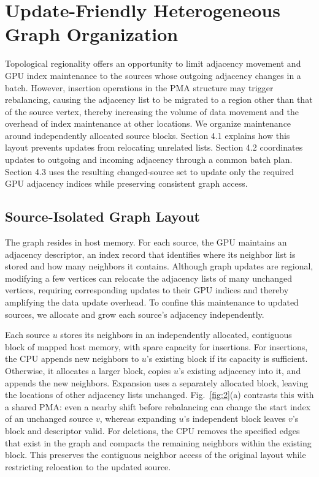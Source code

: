 
\section{Update-Friendly Heterogeneous Graph Organization}


Topological regionality offers an opportunity to limit adjacency movement and GPU index maintenance to the sources whose outgoing adjacency changes in a batch. However, insertion operations in the PMA structure may trigger rebalancing, causing the adjacency list to be migrated to a region other than that of the source vertex, thereby increasing the volume of data movement and the overhead of index maintenance at other locations. We organize maintenance around independently allocated source blocks. Section 4.1 explains how this layout prevents updates from relocating unrelated lists. Section 4.2 coordinates updates to outgoing and incoming adjacency through a common batch plan. Section 4.3 uses the resulting changed-source set to update only the required GPU adjacency indices while preserving consistent graph access.

\subsection{Source-Isolated Graph Layout}


The graph resides in host memory. For each source, the GPU maintains an adjacency descriptor, an index record that identifies where its neighbor list is stored and how many neighbors it contains. Although graph updates are regional, modifying a few vertices can relocate the adjacency lists of many unchanged vertices, requiring corresponding updates to their GPU indices and thereby amplifying the data update overhead. To confine this maintenance to updated sources, we allocate and grow each source's adjacency independently.

Each source $u$ stores its neighbors in an independently allocated, contiguous block of mapped host memory, with spare capacity for insertions. For insertions, the CPU appends new neighbors to $u$'s existing block if its capacity is sufficient. Otherwise, it allocates a larger block, copies $u$'s existing adjacency into it, and appends the new neighbors. Expansion uses a separately allocated block, leaving the locations of other adjacency lists unchanged. Fig.~\ref{fig:2}(a) contrasts this with a shared PMA: even a nearby shift before rebalancing can change the start index of an unchanged source $v$, whereas expanding $u$'s independent block leaves $v$'s block and descriptor valid. For deletions, the CPU removes the specified edges that exist in the graph and compacts the remaining neighbors within the existing block. This preserves the contiguous neighbor access of the original layout while restricting relocation to the updated source.


